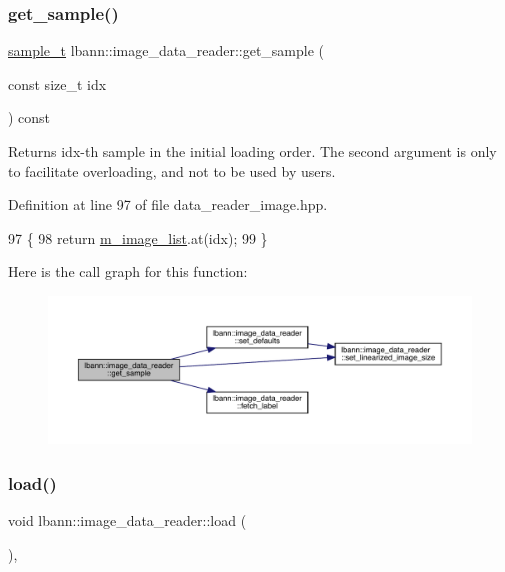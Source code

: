 \subsubsection{\texorpdfstring{get\+\_\+sample()}{get\_sample()}}
{\footnotesize\ttfamily \hyperlink{classlbann_1_1image__data__reader_a7580011ef6ef9da32e1a3bc49ad0706c}{sample\+\_\+t} lbann\+::image\+\_\+data\+\_\+reader\+::get\+\_\+sample (\begin{DoxyParamCaption}\item[{const size\+\_\+t}]{idx }\end{DoxyParamCaption}) const\hspace{0.3cm}{\ttfamily [inline]}}

Returns idx-\/th sample in the initial loading order. The second argument is only to facilitate overloading, and not to be used by users. 

Definition at line 97 of file data\+\_\+reader\+\_\+image.\+hpp.


\begin{DoxyCode}
97                                               \{
98     \textcolor{keywordflow}{return} \hyperlink{classlbann_1_1image__data__reader_ae3fc949bd08c45ceafb1a03503261008}{m\_image\_list}.at(idx);
99   \}
\end{DoxyCode}
Here is the call graph for this function\+:\nopagebreak
\begin{figure}[H]
\begin{center}
\leavevmode
\includegraphics[width=350pt]{classlbann_1_1image__data__reader_ae3f4a0b018e8212a42cbbfbd2b514bf4_cgraph}
\end{center}
\end{figure}
\mbox{\label{classlbann_1_1image__data__reader_a99cb80242d7d20bc1e8baeaff25ff790}} 
\subsubsection{\texorpdfstring{load()}{load()}}
{\footnotesize\ttfamily void lbann\+::image\+\_\+data\+\_\+reader\+::load (\begin{DoxyParamCaption}{ }\end{DoxyParamCaption})\hspace{0.3cm}{\ttfamily [override]}, {\ttfamily [virtual]}}

